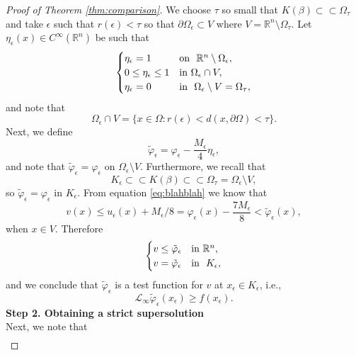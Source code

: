 \documentclass[11pt]{article}
\providecommand{\Linf}{\mathcal{L}_{\infty}}
\providecommand{\Rn}{\mathbb{R}^n}
\numberwithin{equation}{section}
\theoremstyle{definition}
\begin{document}
\begin{proof}[Proof of Theorem \ref{thm:comparison}]
We choose $\tau$ so small that $K(\beta) \subset \subset \Omega_{\tau}$ and take $\epsilon$ such that $r(\epsilon) < \tau$ so that $\partial \Omega_{\epsilon} \subset V$ where $V = \Rn \setminus \Omega_{\tau}$. Let $\eta_{\epsilon}(x) \in C^{\infty}(\Rn)$ be such that
\begin{align*}
     \begin{cases}
                   \eta_{\epsilon} = 1 & \textup{on  } \ \Rn \setminus \Omega_{\epsilon}, \\
                    0 \leq \eta_{\epsilon} \leq 1 & \textup{in  } \Omega_{\epsilon} \cap V, \\
                    \eta_{\epsilon} =0  & \textup{in  } \ \Omega_{\epsilon} \setminus V = \Omega_{\tau},
     \end{cases}
\end{align*}
and note that
$$
\Omega_{\epsilon} \cap V = \{x \in \Omega: r(\epsilon) < d(x, \partial \Omega) < \tau \}.
$$
Next, we define
\begin{equation*}
     \tilde{\varphi}_{\epsilon} = 
                \varphi_{\epsilon} -\frac{M_{\epsilon}}{4} \eta_{\epsilon},
\end{equation*}
and note that $\tilde{\varphi}_{\epsilon}= \varphi_{\epsilon}$ on $\Omega_{\epsilon} \setminus V$. Furthermore, we recall that 
$$
K_{\epsilon} \subset \subset K(\beta) \subset \subset \Omega_{\tau} = \Omega_{\epsilon} \setminus V,
$$
so $\tilde{\varphi}_{\epsilon} = \varphi_{\epsilon}$ in $K_{\epsilon}$. From equation \eqref{eq:blahblah} we know that
$$
v(x) \leq u_{\epsilon}(x) + M_{\epsilon}/8=\varphi_{\epsilon}(x)-\frac{7 M_{\epsilon}}{8} < \tilde{\varphi}_{\epsilon}(x),
$$
when $x \in V$. Therefore
\begin{align*}
     \begin{cases}
                   v \leq \tilde{\varphi}_{\epsilon} &\textup{in  } \Rn, \\
                   v= \tilde{\varphi}_{\epsilon} &\textup{in  } \ K_{\epsilon},
     \end{cases}
\end{align*}
and we conclude that $\tilde{\varphi}_{\epsilon}$ is a test function for $v$ at $x_{\epsilon} \in K_{\epsilon}$, i.e.,
\begin{equation}
\label{eq:contradiction}
\Linf \tilde{\varphi}_{\epsilon}(x_{\epsilon}) \geq f(x_{\epsilon}).    
\end{equation}
\textbf{Step 2. Obtaining a strict supersolution}\\
Next, we note that
\begin{align}

\end{align}
\end{proof}
\end{document}
